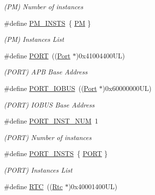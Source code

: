 \begin{DoxyCompactItemize}
\begin{DoxyCompactList}\small\item\em (PM) Number of instances \end{DoxyCompactList}\item 
\#define \mbox{\hyperlink{group___s_a_m_d21_g15_l__base_ga8706ce17cb90c1800b8bccd415e9251d}{P\+M\+\_\+\+I\+N\+S\+TS}}~\{ \mbox{\hyperlink{group___s_a_m_d21_j18_a__base_ga23c7d58108d99a089ce0824823e6b950}{PM}} \}
\begin{DoxyCompactList}\small\item\em (PM) Instances List \end{DoxyCompactList}\item 
\#define \mbox{\hyperlink{group___s_a_m_d21_g15_l__base_ga614217d263be1fb1a5f76e2ff7be19a2}{P\+O\+RT}}~((\mbox{\hyperlink{struct_port}{Port}}     $\ast$)0x41004400\+U\+L)
\begin{DoxyCompactList}\small\item\em (P\+O\+RT) A\+PB Base Address \end{DoxyCompactList}\item 
\#define \mbox{\hyperlink{group___s_a_m_d21_g15_l__base_gafb94fe0c3ae0b887c1b1c49bf65dea12}{P\+O\+R\+T\+\_\+\+I\+O\+B\+US}}~((\mbox{\hyperlink{struct_port}{Port}}     $\ast$)0x60000000\+U\+L)
\begin{DoxyCompactList}\small\item\em (P\+O\+RT) I\+O\+B\+US Base Address \end{DoxyCompactList}\item 
\#define \mbox{\hyperlink{group___s_a_m_d21_g15_l__base_gac581aef3aa2ab0b067ee84aa3443be17}{P\+O\+R\+T\+\_\+\+I\+N\+S\+T\+\_\+\+N\+UM}}~1
\begin{DoxyCompactList}\small\item\em (P\+O\+RT) Number of instances \end{DoxyCompactList}\item 
\#define \mbox{\hyperlink{group___s_a_m_d21_g15_l__base_ga58dbd6d300ad7fca1c3f7a685edd26de}{P\+O\+R\+T\+\_\+\+I\+N\+S\+TS}}~\{ \mbox{\hyperlink{group___s_a_m_d21_j18_a__base_ga614217d263be1fb1a5f76e2ff7be19a2}{P\+O\+RT}} \}
\begin{DoxyCompactList}\small\item\em (P\+O\+RT) Instances List \end{DoxyCompactList}\item 
\#define \mbox{\hyperlink{group___s_a_m_d21_g15_l__base_ga5359a088f5d8b20ce74d920e46059304}{R\+TC}}~((\mbox{\hyperlink{union_rtc}{Rtc}}      $\ast$)0x40001400\+U\+L)

\end{DoxyCompactItemize}
